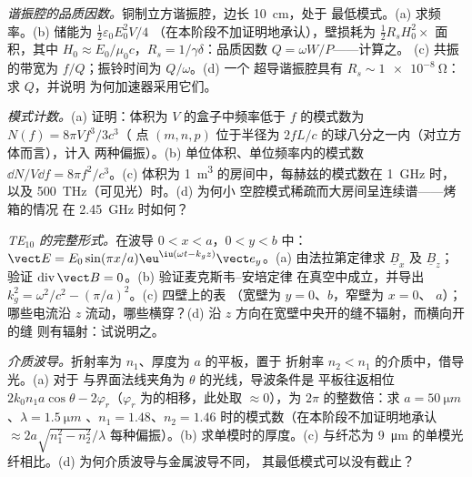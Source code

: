 \begin{exercise}[$\star\star$]\label{exo:b2:guided-waves:8}
\emph{谐振腔的品质因数。}铜制立方谐振腔，边长 \qty{10}{cm}，处于
最低模式。(a) 求频率。(b) 储能为 $\tfrac12\varepsilon_0E_0^2V/4$
（在本阶段不加证明地承认），壁损耗为 $\tfrac12R_sH_0^2\times$ 面积，其中 $H_0 \approx E_0/
\mu_0c$，$R_s = 1/\gamma\delta$：品质因数 $Q = \omega W/P$——计算之。
(c) 共振的带宽为 $f/Q$；振铃时间为 $Q/\omega$。(d) 一个
超导谐振腔具有 $R_s \sim \qty{1e-8}{\ohm}$：求 $Q$，并说明
为何加速器采用它们。
\end{exercise}

\begin{exercise}[$\star\star$]\label{exo:b2:guided-waves:9}
\emph{模式计数。}(a) 证明：体积为
$V$ 的盒子中频率低于 $f$ 的模式数为 $N(f) = 8\pi Vf^3/3c^3$（
点 $(m, n, p)$ 位于半径为 $2fL/c$ 的球八分之一内（对立方体而言），计入
两种偏振）。(b) 单位体积、单位频率内的模式数
$\dd N/V\dd f = 8\pi f^2/c^3$。(c) 体积为 \qty{1}{m^3} 的房间中，每赫兹的模式数在
\qty{1}{GHz} 时，以及 \qty{500}{THz}（可见光）时。(d) 为何小
空腔模式稀疏而大房间呈连续谱——烤箱的情况
在 \qty{2.45}{GHz} 时如何？
\end{exercise}

\begin{exercise}[$\star\star\star$]\label{exo:b2:guided-waves:10}
\emph{TE$_{10}$ 的完整形式。}在波导 $0 < x < a$，$0 < y < b$ 中：$\vect E =
E_0\sin(\pi x/a)\eu^{\iu(\omega t - k_gz)}\vect e_y$。(a) 由法拉第定律求 $\underline B_x$
及 $\underline B_z$；验证 $\operatorname{div}\vect B = 0$。(b) 验证麦克斯韦–安培定律
在真空中成立，并导出 $k_g^2 = \omega^2/c^2 - (\pi/a)^2$。(c) 四壁上的表
（宽壁为 $y = 0$、$b$，窄壁为 $x = 0$、
$a$）；哪些电流沿 $z$ 流动，哪些横穿？(d) 沿
$z$ 方向在宽壁中央开的缝不辐射，而横向开的缝
则有辐射：试说明之。
\end{exercise}

\begin{exercise}[$\star\star\star$]\label{exo:b2:guided-waves:11}
\emph{介质波导。}折射率为 $n_1$、厚度为 $a$ 的平板，置于
折射率 $n_2 < n_1$ 的介质中，借导光。(a) 对于
与界面法线夹角为 $\theta$ 的光线，导波条件是
平板往返相位 $2k_0n_1a\cos\theta - 2\varphi_r$（$\varphi_r$
为的相移，此处取 $\approx 0$），为
$2\pi$ 的整数倍：求 $a = \qty{50}{\micro m}$、$\lambda = \qty{1.5}{\micro m}$
、$n_1 = 1.48$、$n_2 = 1.46$ 时的模式数（在本阶段不加证明地承认
$\approx 2a\sqrt{n_1^2 - n_2^2}/\lambda$ 每种偏振）。(b) 求单模时的厚度。(c) 与纤芯为
\qty{9}{\micro m} 的单模光纤相比。(d) 为何介质波导与金属波导不同，
其最低模式可以没有截止？
\end{exercise}

